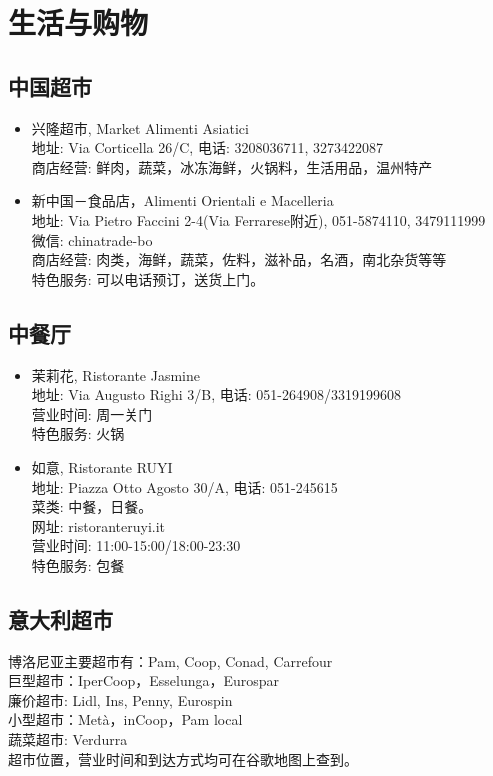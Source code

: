 \chapter{生活与购物}              



\section{中国超市}



\begin{itemize}
\item 兴隆超市, Market Alimenti Asiatici\\
地址: Via Corticella 26/C, 电话: 3208036711, 3273422087\\
商店经营: 鲜肉，蔬菜，冰冻海鲜，火锅料，生活用品，温州特产

\item 新中国－食品店，Alimenti Orientali e Macelleria\\
地址: Via Pietro Faccini 2-4(Via Ferrarese附近), 051-5874110, 3479111999\\
微信: chinatrade-bo\\
商店经营: 肉类，海鲜，蔬菜，佐料，滋补品，名酒，南北杂货等等\\
特色服务: 可以电话预订，送货上门。
\end{itemize}



\section{中餐厅}
\begin{itemize}
\item 茉莉花, Ristorante Jasmine\\
地址: Via Augusto Righi 3/B, 电话: 051-264908/3319199608 \\
营业时间: 周一关门\\
特色服务: 火锅

\item 如意, Ristorante RUYI\\
地址: Piazza Otto Agosto 30/A, 电话: 051-245615\\
菜类: 中餐，日餐。\\
网址: ristoranteruyi.it \\
营业时间: 11:00-15:00/18:00-23:30\\
特色服务: 包餐
\end{itemize}


\section{意大利超市}
\noindent 博洛尼亚主要超市有：Pam, Coop, Conad, Carrefour\\
巨型超市：IperCoop，Esselunga，Eurospar\\
廉价超市: Lidl, Ins, Penny, Eurospin\\
小型超市：Metà，inCoop，Pam local\\
蔬菜超市: Verdurra\\
超市位置，营业时间和到达方式均可在谷歌地图上查到。

